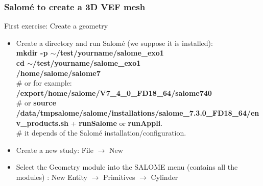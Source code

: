\documentclass[10pt]{beamer}
\begin{document}
\begin{frame}
\frametitle{Salom\'e to create a 3D VEF mesh}
\begin{block}{First exercise: Create a geometry}

\begin{itemize}
\item Create a directory and run Salom\'e (we suppose it is installed):\\
\textbf{mkdir -p $\sim$/test/yourname/salome\_exo1} \\
\textbf{cd $\sim$/test/yourname/salome\_exo1} \\

\textbf{/home/salome/salome7} \\
\# or for example: {\scriptsize{\textbf{/export/home/salome/V7\_4\_0\_FD18\_64/salome740}}} \\
\# or {\scriptsize{\textbf{source /data/tmpsalome/salome/installations/salome\_7.3.0\_FD18\_64/env\_products.sh} + \textbf{runSalome} or \textbf{runAppli}.}} \\
\# it depends of the Salom\'e installation/configuration.

\item Create a new study: File $\rightarrow$ New

\item Select the Geometry module into the SALOME menu (contains all the modules) : New Entity $\rightarrow$ Primitives $\rightarrow$ Cylinder
\end{itemize}

\end{block}
\end{frame}
\end{document}
